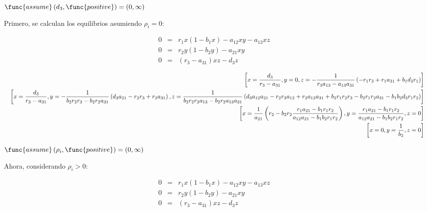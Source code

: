 \documentclass[letterpaper,11pt]{article}
\begin{document}
$\func{assume}\left( d_{3},\func{positive}\right) =\allowbreak \left(
0,\infty \right) $

\bigskip Primero, se calculan los equilibrios asumiendo $\rho _{i}=0:$

\begin{eqnarray*}
0 &=&r_{1}x(1-b_{1}x)-a_{12}xy-a_{13}xz \\
0 &=&r_{2}y(1-b_{2}y)-a_{21}xy \\
0 &=&(r_{3}-a_{31})xz-d_{3}z
\end{eqnarray*}

\begin{eqnarray*}
&&\left[ x=\frac{d_{3}}{r_{3}-a_{31}},y=0,z=-\frac{1}{%
r_{3}a_{13}-a_{13}a_{31}}\left(
-r_{1}r_{3}+r_{1}a_{31}+b_{1}d_{3}r_{1}\right) \right] \\
&&\left[ x=\frac{d_{3}}{r_{3}-a_{31}},y=-\frac{1}{%
b_{2}r_{2}r_{3}-b_{2}r_{2}a_{31}}\left(
d_{3}a_{21}-r_{2}r_{3}+r_{2}a_{31}\right) ,z=\frac{1}{%
b_{2}r_{2}r_{3}a_{13}-b_{2}r_{2}a_{13}a_{31}}\left(
d_{3}a_{12}a_{21}-r_{2}r_{3}a_{12}+r_{2}a_{12}a_{31}+b_{2}r_{1}r_{2}r_{3}-b_{2}r_{1}r_{2}a_{31}-b_{1}b_{2}d_{3}r_{1}r_{2}\right) %
\right] \\
&&\left[ x=\frac{1}{a_{21}}\left( r_{2}-b_{2}r_{2}\frac{%
r_{1}a_{21}-b_{1}r_{1}r_{2}}{a_{12}a_{21}-b_{1}b_{2}r_{1}r_{2}}\right) ,y=%
\frac{r_{1}a_{21}-b_{1}r_{1}r_{2}}{a_{12}a_{21}-b_{1}b_{2}r_{1}r_{2}},z=0%
\right] \\
&&\left[ x=0,y=\frac{1}{b_{2}},z=0\right]
\end{eqnarray*}

\bigskip $\func{assume}\left( \rho _{i},\func{positive}\right) =\allowbreak
\left( 0,\infty \right) $

Ahora, considerando $\rho _{i}>0:$

\begin{eqnarray*}
0 &=&r_{1}x(1-b_{1}x)-a_{12}xy-a_{13}xz \\
0 &=&r_{2}y(1-b_{2}y)-a_{21}xy \\
0 &=&(r_{3}-a_{31})xz-d_{3}z
\end{eqnarray*}

\bigskip
\end{document}
